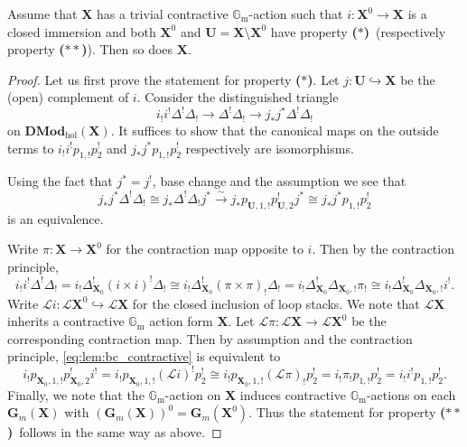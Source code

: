 \documentclass{oupau}
\theoremstyle{remark}
\newcommand\Gm{\mathbb{G}_{\mathrm{m}}}     %
\let\stack\mathbf                           %
\newcommand\cat{\mathbf}                    %
\newcommand\isoto{\xrightarrow{\sim}}       %
\newcommand\catDMod[2][]{\cat{DMod}_{#1}(#2)}   %
\newcommand\catDModHol[1]{\catDMod[\mathrm{hol}]{#1}}   %
\newcommand\bc{\textbf{($\mathbf{*}$)}}
\newcommand\hbc{\textbf{($\mathbf{**}$)}}
\newcommand\ls[1]{\mathcal{L} #1}
\begin{document}
\begin{proposition}\label{prop:contractive}
    Assume that $\stack X$ has a trivial contractive $\Gm$-action such that $i\colon \stack X^0 \to \stack X$ is a closed immersion and both $\stack X^0$ and $\stack U = \stack X\setminus \stack X^0$ have property \bc\ (respectively property \hbc).
    Then so does $\stack X$.
\end{proposition}

\begin{proof}
    Let us first prove the statement for property \bc.
    Let $j\colon \stack U \hookrightarrow \stack X$ be the (open) complement of $i$.
    Consider the distinguished triangle
    \[
        i_!i^! \Delta^!\Delta_! \to \Delta^!\Delta_! \to j_*j^*\Delta^!\Delta_!
    \]
    on $\catDModHol{\stack X}$.
    It suffices to show that the canonical maps on the outside terms to $i_!i^! p_{1,!}p_2^!$ and $j_*j^* p_{1,!}p_2^!$ respectively are isomorphisms.
    
    Using the fact that $j^* = j^!$, base change and the assumption we see that
    \[
        j_*j^*\Delta^!\Delta_! \cong
        j_*\Delta^!\Delta_!j^* \isoto
        j_*p_{\stack U,1,!}p_{\stack U,2}^! j^* \cong
        j_*j^* p_{1,!}p_2^!
    \]
    is an equivalence.

    Write $\pi\colon \stack X \to \stack X^0$ for the contraction map opposite to $i$.
    Then by the contraction principle,
    \begin{equation}\label{eq:lem:bc_contractive}
        i_!i^! \Delta^!\Delta_! =
        i_!\Delta_{\stack X_0}^!(i\times i)^! \Delta_! \cong
        i_!\Delta_{\stack X_0}^!(\pi\times \pi)_! \Delta_! =
        i_!\Delta_{\stack X_0}^!\Delta_{\stack X_0,!} \pi_! \cong
        i_!\Delta_{\stack X_0}^!\Delta_{\stack X_0,!} i^!.
    \end{equation}
    Write $\ls i \colon \ls\stack X^0 \hookrightarrow \ls\stack X$ for the closed inclusion of loop stacks.
    We note that $\ls\stack X$ inherits a contractive $\Gm$ action form $\stack X$.
    Let $\ls \pi\colon \ls\stack X \to \ls\stack X^0$ be the corresponding contraction map.
    Then by assumption and the contraction principle, \eqref{eq:lem:bc_contractive} is equivalent to
    \[
        i_!p_{\stack X_0,1,!}p_{\stack X_0,2}^! i^! =
        i_!p_{\stack X_0,1,!} (\ls i)^! p_{2}^! \cong
        i_!p_{\stack X_0,1,!} (\ls \pi)_! p_{2}^! =
        i_! \pi_! p_{1,!} p_{2}^! =
        i_! i^! p_{1,!} p_{2}^!.
    \]
    Finally, we note that the $\Gm$-action on $\stack X$ induces contractive $\Gm$-actions on each $\stack G_m(\stack X)$ with $(\stack G_m(\stack X))^0 = \stack G_m(\stack X^0)$.
    Thus the statement for property \hbc\ follows in the same way as above.
\end{proof}
\end{document}
